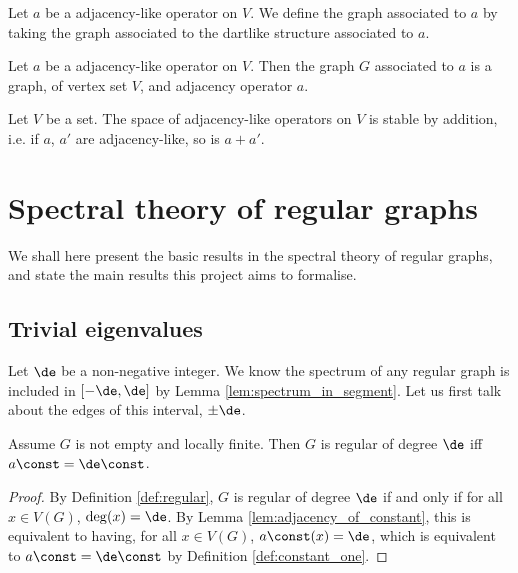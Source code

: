 \begin{definition}
  \label{def:graph_of_adjlike}
  Let $a$ be a adjacency-like operator on $V$.
  We define the graph associated to $a$ by taking the graph associated to the dartlike structure
  associated to $a$.
\end{definition}

\begin{lemma}
  \label{lem:adjacency_of_graph_of_adjacency}
  Let $a$ be a adjacency-like operator on $V$.
  Then the graph $G$ associated to $a$ is a graph, of vertex set $V$, and adjacency operator $a$.
\end{lemma}

\begin{lemma}
  \label{lem:adjlike_addition}
  Let $V$ be a set. The space of adjacency-like operators on $V$ is stable by addition, i.e.
  if $a$, $a'$ are adjacency-like, so is $a+a'$.
\end{lemma}


\chapter{Spectral theory of regular graphs}

We shall here present the basic results in the spectral theory of regular graphs, and
state the main results this project aims to formalise.

\section{Trivial eigenvalues}
\label{sec:trivial_eigenvalues}

Let $\de$ be a non-negative integer.
We know the spectrum of any regular graph is included in $[-\de,\de]$ by
Lemma \ref{lem:spectrum_in_segment}.
Let us first talk about the edges of this interval, $\pm \de$.

\begin{lemma}
  \label{lem:adjacency_of_constant_regular}
  Assume $G$ is not empty and locally finite. Then
  $G$ is regular of degree $\de$ iff $a \const = \de \const$.
\end{lemma}

\begin{proof}
  By Definition \ref{def:regular},
  $G$ is regular of degree $\de$ if and only if for all $x \in V(G)$,
  $\deg(x)=\de$.
  By Lemma \ref{lem:adjacency_of_constant}, this is equivalent to
  having, for all $x \in V(G)$, $a \const (x) = \de$, which is equivalent to
  $a \const = \de \const$ by Definition \ref{def:constant_one}.
\end{proof}

